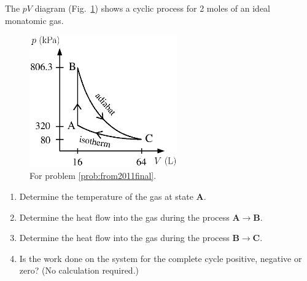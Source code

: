 \begin{problem}
 The $pV$ diagram (Fig.~\ref{fig:from2011final}) shows a cyclic process for 2 moles 
 of an ideal monatomic gas.  
\begin{figure}
\begin{center}
\includegraphics[width=2.5in]{gas_processes/pVfinal.eps}
\caption{For problem \ref{prob:from2011final}.}
\label{fig:from2011final}
\end{center}
\end{figure}

\begin{enumerate}
\item Determine the temperature of the gas at state {\bf A}.
\item Determine the heat flow into the gas during the process 
{\bf A}$\rightarrow${\bf B}.
\item Determine the heat flow into the gas during the process 
{\bf B}$\rightarrow${\bf C}.
\item Is the work done on the system for the complete cycle
positive, negative or zero? (No calculation required.)
\end{enumerate}
\label{prob:from2011final}
\end{problem}






